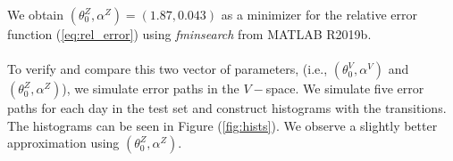 \documentclass[11pt]{article}
\theoremstyle{definition}
\begin{document}

%


We obtain $(\theta_0^Z,\alpha^Z)=(1.87,0.043)$ as a minimizer for the relative error function (\ref{eq:rel_error}) using \textit{fminsearch} from MATLAB R2019b.\\
\quad\\
To verify and compare this two vector of parameters, (i.e., $(\theta_0^V,\alpha^V)$ and $(\theta_0^Z,\alpha^Z)$), we simulate error paths in the $V-$space. We simulate five error paths for each day in the test set and construct histograms with the transitions. The histograms can be seen in Figure (\ref{fig:hists}). We observe a slightly better approximation using $(\theta^Z_0,\alpha^Z)$.
\end{document}
